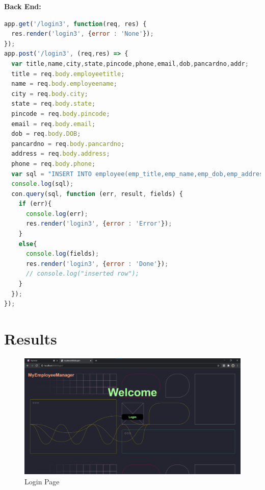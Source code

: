 \documentclass[12pt]{article}
\begin{document}
\newpage
\noindent
\textbf{Back End:}
\begin{lstlisting}[language = javascript]
app.get('/login3', function(req, res) {
  res.render('login3', {error : 'None'});
});
app.post('/login3', (req,res) => {
  var title,name,city,state,pincode,phone,email,dob,pancardno,addr;
  title = req.body.employeetitle;
  name = req.body.employeename;
  city = req.body.city;
  state = req.body.state;
  pincode = req.body.pincode;
  email = req.body.email;
  dob = req.body.DOB;
  pancardno = req.body.pancardno;
  address = req.body.address;
  phone = req.body.phone;
  var sql = "INSERT INTO employee(emp_title,emp_name,emp_dob,emp_address,emp_city,emp_state,emp_pincode,emp_mobile_number,emp_pancard_number,emp_mail_id) values ('"+title+"','"+name+"','"+dob+"','"+address+"','"+city+"','"+state+"',"+pincode+",'"+phone+"','"+pancardno+"','"+email+"');"
  console.log(sql);
  con.query(sql, function (err, result, fields) {
    if (err){
      console.log(err);
      res.render('login3', {error : 'Error'});
    }
    else{
      console.log(fields);
      res.render('login3', {error : 'Done'});
      // console.log("inserted row");
    }
  });
});
\end{lstlisting}

\newpage            %
\section{Results}   %

\begin{figure}[h]
    \centering
    \includegraphics[width = \columnwidth]{screenshots/loginpage1.png}
    \caption{Login Page}
    \label{fig:my_label}
\end{figure}
\end{document}
